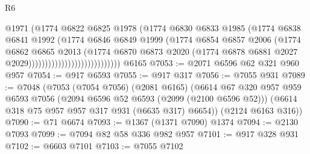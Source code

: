 \begin{lexlean}{R6}
\begin{coremodule}
                                            @1971
                                            (@1774
                                              @6822
                                              @6825
                                              @1978
                                              (@1774
                                                @6830
                                                @6833
                                                @1985
                                                (@1774
                                                  @6838
                                                  @6841
                                                  @1992
                                                  (@1774
                                                    @6846
                                                    @6849
                                                    @1999
                                                    (@1774
                                                      @6854
                                                      @6857
                                                      @2006
                                                      (@1774
                                                        @6862
                                                        @6865
                                                        @2013
                                                        (@1774
                                                          @6870
                                                          @6873
                                                          @2020
                                                          (@1774
                                                            @6878
                                                            @6881
                                                            @2027
                                                            @2029))))))))))))))))))))))))))))
    @6165
@7053 := @2071 @6596 @62 @321 @960 @957
@7054 := @917 @6593
@7055 := @917 @317
@7056 := @7055 @931
@7089 := @7048
    (@7053
      (@7054 @7056)
      (@2081 @6165)
      (@6614
        @67
        @320
        @957
        @959
        @6593
        @7056
        (@2094 @6596 @52 @6593 (@2099 (@2100 @6596 @52)))
        (@6614 @318 @75 @957 @957 @317 @931 (@6635 @317) @6654))
      (@2124 @6163 @316))
@7090 := @71 @6674
@7093 := @1367 (@1371 @7090) @1374
@7094 := @2130 @7093
@7099 := @7094 @82 @58 @336 @982 @957
@7101 := @917 @328 @931
@7102 := @6603 @7101
@7103 := @7055 @7102

\end{coremodule}
\end{lexlean}
